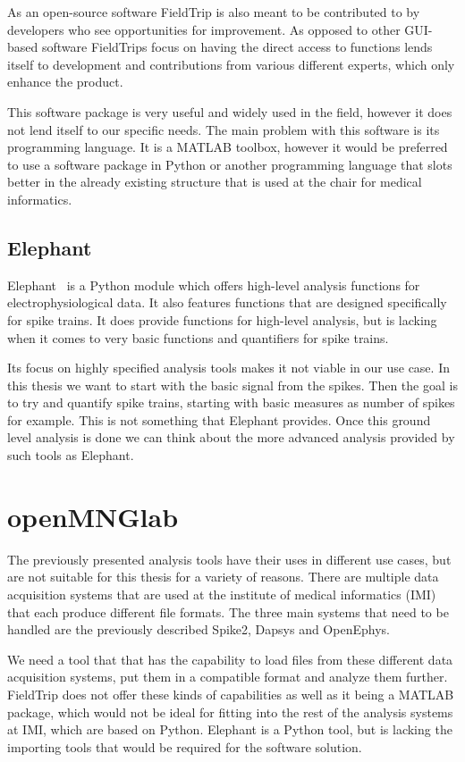 As an open-source software FieldTrip is also meant to be contributed to by developers who see opportunities for improvement. As opposed to other GUI-based software FieldTrips focus on having the direct access to functions lends itself to development and contributions from various different experts, which only enhance the product.

This software package is very useful and widely used in the field, however it does not lend itself to our specific needs.
The main problem with this software is its programming language. It is a MATLAB toolbox, however it would be preferred to use a software package in Python or another programming language that slots better in the already existing structure that is used at the chair for medical informatics.  

\subsection{Elephant}
Elephant~\cite{elephant18} is a Python module which offers high-level analysis functions for electrophysiological data.
It also features functions that are designed specifically for spike trains. It does provide functions for high-level analysis, but is lacking when it comes to very basic functions and quantifiers for spike trains. 

Its focus on highly specified analysis tools makes it not viable in our use case. In this thesis we want to start with the basic signal from the spikes. Then the goal is to try and quantify spike trains, starting with basic measures as number of spikes for example. This is not something that Elephant provides. Once this ground level analysis is done we can think about the more advanced analysis provided by such tools as Elephant.

\section{openMNGlab}
The previously presented analysis tools have their uses in different use cases, but are not suitable for this thesis for a variety of reasons.
There are multiple data acquisition systems that are used at the institute of medical informatics (IMI) that each produce different file formats. The three main systems that need to be handled are the previously described Spike2, Dapsys and OpenEphys.
 
We need a tool that that has the capability to load files from these different data acquisition systems, put them in a compatible format and analyze them further.  FieldTrip does not offer these kinds of capabilities as well as it being a MATLAB package, which would not be ideal for fitting into the rest of the analysis systems at IMI, which are based on Python. Elephant is a Python tool, but is lacking the importing tools that would be required for the software solution. 

